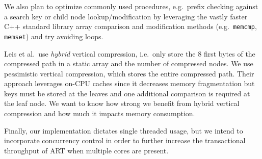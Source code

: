 \documentclass[abstracton,12pt]{scrartcl}
\theoremstyle{definition}
\begin{document}
We also plan to optimize commonly used procedures, e.g.\ prefix checking
against a search key or child node lookup/modification by leveraging the vastly
faster C++ standard library array comparison and modification methods
(e.g.\ \texttt{memcmp}, \texttt{memset}) and try avoiding loops.

Leis et al.\ use \textit{hybrid} vertical compression, i.e.\ only store the
8 first bytes of the compressed path in a static array and the number of
compressed nodes. We use pessimistic vertical compression, which stores
the entire compressed path.
Their approach leverages on-CPU caches since it decreases memory fragmentation
but keys must be stored at the leaves and one additional comparison is
required at the leaf node. We want to know how strong we benefit from hybrid 
vertical compression and how much it impacts memory consumption.

Finally, our implementation dictates single threaded usage, but we intend to
incorporate concurrency control in order to further increase the transactional
throughput of ART when multiple cores are present.

\newpage



\end{document}

